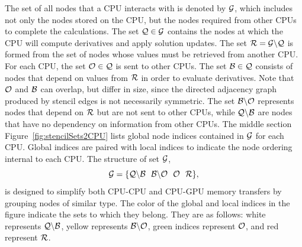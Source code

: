 \documentclass{report}
\begin{document}
The set of all nodes that a CPU interacts with is denoted by $\mathcal{G}$, which includes not only the nodes stored on the CPU, but the nodes required from other CPUs to complete the calculations. 
The set $\mathcal{Q}\in\mathcal{G}$ contains the nodes at which the CPU 
will compute derivatives and apply solution updates. 
The set $\mathcal{R} = \mathcal{G} \backslash \mathcal{Q}$ 
is formed from the set of nodes whose values must be retrieved from another CPU. 
For each CPU, the set $\mathcal{O}\in\mathcal{Q}$ is sent to other CPUs. The set $\mathcal{B}\in\mathcal{Q}$ consists of nodes that depend on  values from $\mathcal{R}$ in order to evaluate derivatives. Note that $\mathcal{O}$ and $\mathcal{B}$ can overlap, but differ in size, since the directed adjacency graph produced by stencil edges is not necessarily symmetric. The set $\mathcal{B} \backslash \mathcal{O}$ represents nodes that depend on $\mathcal{R}$ but are not sent to other CPUs, while $\mathcal{Q} \backslash \mathcal{B}$ are nodes that have no dependency on information from other CPUs.
The middle section Figure~\ref{fig:stencilSets2CPU} lists global node indices contained in $\mathcal{G}$ for each CPU. Global indices are paired with local indices to indicate the node ordering internal to each CPU. The structure of set $\mathcal{G}$,
   \begin{equation}
 		\setAllNodes = \{ \mathcal{Q}\backslash\mathcal{B} \ \ \mathcal{B}\backslash\mathcal{O} \ \ \mathcal{O} \ \ \setDepend \},
            \label{eqn:decompose_g}
        \end{equation}
 is designed to simplify both CPU-CPU and CPU-GPU memory transfers by grouping nodes of similar type. The color of the global and local indices in the figure
 indicate the sets to which they belong. They are as follows: white represents $\mathcal{Q} \backslash \mathcal{B}$, 
 yellow represents $\mathcal{B} \backslash \mathcal{O}$, green indices 
 represent $\mathcal{O}$, and red represent $\mathcal{R}$.  
\end{document}
